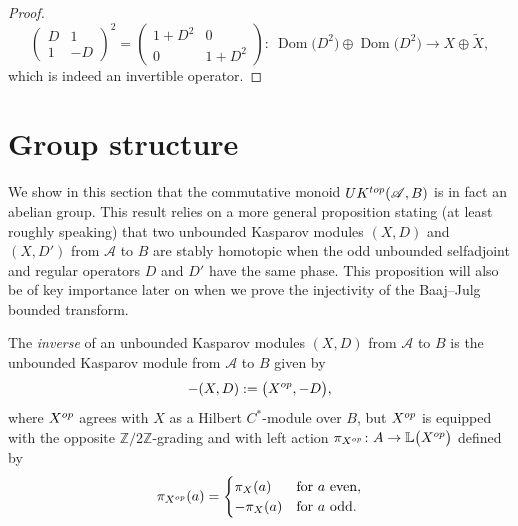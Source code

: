 \documentclass[11pt]{article}
\numberwithin{equation}{section}
\newcommand{\op}{\oplus}
\newcommand{\zz}{\mathbb{Z}}
\newcommand{\s}[1]{\mathscr{#1}}
\newcommand{\B}[1]{\mathbb{#1}}
\newcommand{\wit}{\widetilde}
\newcommand\sA{\mathscr{A}}
\begin{document}
\begin{proof}
\[
\left(\begin{matrix} D & 1 \\ 1 & - D\end{matrix}\right)^2 = \left(\begin{matrix} 1 + D^2 & 0 \\ 0 & 1 + D^2 \end{matrix}\right)\colon \ \operatorname{Dom}\big(D^2\big) \op \operatorname{Dom}\big(D^2\big) \to X \op \wit{X} ,
\]
which is indeed an invertible operator.
\end{proof}

\section{Group structure}\label{s:group}
We show in this section that the commutative monoid $UK^{{\rm top}}(\sA,B)$ is in fact an abelian group. This result relies on a more general proposition stating (at least roughly speaking) that two unbounded Kasparov modules $(X,D)$ and $(X,D')$ from $\s A$ to $B$ are stably homotopic when the odd unbounded selfadjoint and regular operators $D$ and $D'$ have the same phase. This proposition will also be of key importance later on when we prove the injectivity of the Baaj--Julg bounded transform.

\begin{dfn}\label{d:inv}The \emph{inverse} of an unbounded Kasparov modules $(X,D)$ from $\s A$ to $B$ is the unbounded Kasparov module from $\s A$ to $B$ given by
\[
-(X,D) := \big( X^{{\rm op}},-D\big) ,
\]
where $X^{{\rm op}}$ agrees with $X$ as a Hilbert $C^*$-module over $B$, but $X^{{\rm op}}$ is equipped with the opposite $\zz/2\zz$-grading and with left action $\pi_{X^{{\rm op}}}\colon A \to \B L\big(X^{{\rm op}}\big)$ defined by
\[
\pi_{X^{{\rm op}}}(a) = \begin{cases} \pi_X(a) & \mbox{for} \ a \mbox{ even}, \\ -\pi_X(a) & \mbox{for} \ a \mbox{ odd}.\end{cases}
\]
\end{dfn}
\end{document}
